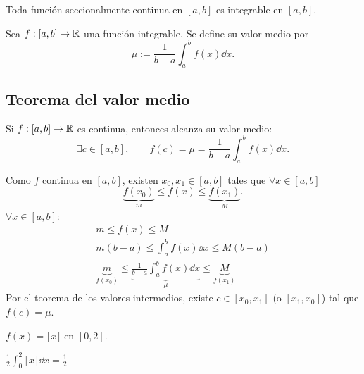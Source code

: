 \documentclass[11pt,a4paper]{article}
\begin{document}
\begin{proposicion}
Toda función seccionalmente continua en $[a,b]$ es integrable en $[a,b]$.
\end{proposicion}

\begin{definicion}
Sea $f:[a,b]\to\mathbb{R}$ una función integrable. Se define su valor medio por
\[
  \mu:=\frac{1}{b-a}\int_a^b f(x)\dd x.
\]
\end{definicion}

\subsection{Teorema del valor medio}

\begin{teorema}
Si $f:[a,b]\to\mathbb{R}$ es continua, entonces alcanza su valor medio:
\[
  \exists c\in[a,b],\qquad f(c)=\mu=\frac{1}{b-a}\int_a^b f(x)\dd x.
\]
\end{teorema}

\begin{demo}
Como $f$ continua en $[a,b]$, existen $x_0,x_1\in[a,b]$ tales que $\forall x\in[a,b]$
\[
  \underbrace{f(x_0)}_{m}\leq f(x)\leq\underbrace{f(x_1)}_{M}.
\]
$\forall x\in[a,b]$:
\begin{gather*}
  m\leq f(x)\leq M\\
  m(b-a)\leq\int_a^b f(x)\dd x\leq M(b-a)\\
  \underbrace{m}_{f(x_0)}\leq\underbrace{\frac{1}{b-a}\int_a^b f(x)\dd x}_{\mu}\leq\underbrace{M}_{f(x_1)}
\end{gather*}
Por el teorema de los valores intermedios, existe $c\in[x_0,x_1]$ (o $[x_1,x_0]$) tal que $f(c)=\mu$.
\end{demo}

\begin{contraejemplo}
$f(x)=\lfloor x\rfloor$ en $[0,2]$.

\begin{center}
\qquad\qquad
$\displaystyle\frac12\int_0^2\lfloor x\rfloor\dd x=\frac12$
\end{center}
\end{contraejemplo}


\end{document}

